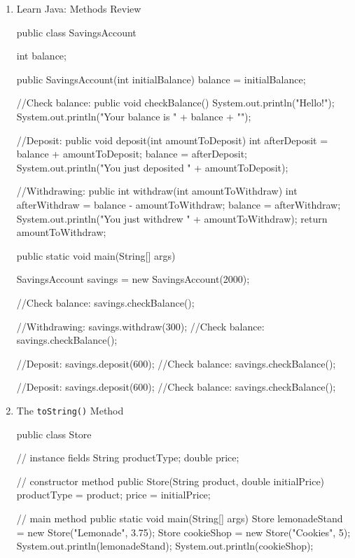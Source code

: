 \documentclass[a4paper,12pt]{article}
\begin{document}
\fontsize{14pt}{15.6pt}
\selectfont

\begin{enumerate}

\item Learn Java: Methods Review
\begin{javacode}
public class SavingsAccount {

  int balance;

  public SavingsAccount(int initialBalance) {
    balance = initialBalance;
  }

  //Check balance:
  public void checkBalance() {
    System.out.println("Hello!");
    System.out.println("Your balance is " + balance + "\n");
  }

  //Deposit:
  public void deposit(int amountToDeposit) {
    int afterDeposit = balance + amountToDeposit;
    balance = afterDeposit;
    System.out.println("You just deposited " + amountToDeposit);
  }

  //Withdrawing:
  public int withdraw(int amountToWithdraw) {
    int afterWithdraw = balance - amountToWithdraw;
    balance = afterWithdraw;
    System.out.println("You just withdrew " + amountToWithdraw);
    return amountToWithdraw;
  }

  public static void main(String[] args) {
    SavingsAccount savings = new SavingsAccount(2000);

    //Check balance:
    savings.checkBalance();

    //Withdrawing:
    savings.withdraw(300);
    //Check balance:
    savings.checkBalance();

    //Deposit:
    savings.deposit(600);
    //Check balance:
    savings.checkBalance();

    //Deposit:
    savings.deposit(600);
    //Check balance:
    savings.checkBalance();
  }
}
\end{javacode}

\item The \verb|toString()| Method
\begin{javacode}
public class Store {
  // instance fields
  String productType;
  double price;
  
  // constructor method
  public Store(String product, double initialPrice) {
    productType = product;
    price = initialPrice;
  }

  // main method
  public static void main(String[] args) {
    Store lemonadeStand = new Store("Lemonade", 3.75);
    Store cookieShop = new Store("Cookies", 5);
    System.out.println(lemonadeStand);
    System.out.println(cookieShop);
  }
  	
}
\end{javacode}
\end{enumerate}
\end{document}
